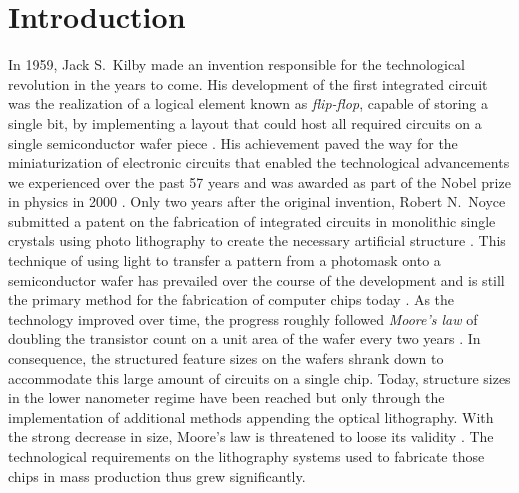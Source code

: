 \glsresetall
\chapter{Introduction} \label{ch:Intro}
In 1959, Jack S.~Kilby made an invention responsible for the technological revolution in the years to come. His development of the first integrated circuit was the realization of a logical element known as \emph{flip-flop}, capable of storing a single bit, by implementing a layout that could host all required circuits on a single semiconductor wafer piece  \cite{kilby_invention_1976}. His achievement paved the way for the miniaturization of electronic circuits that enabled the technological advancements we experienced over the past 57 years and was awarded as part of the Nobel prize in physics in 2000 \cite{noauthor_press_nodate}. Only two years after the original invention, Robert N.~Noyce submitted a patent on the fabrication of integrated circuits in monolithic single crystals using photo lithography to create the necessary artificial structure \cite{noyce_semiconductor_1961}. This technique of using light to transfer a pattern from a photomask onto a semiconductor wafer has prevailed over the course of the development and is still the primary method for the fabrication of computer chips today \cite{mack_fundamental_2008}. As the technology improved over time, the progress roughly followed \emph{Moore's law} of doubling the transistor count on a unit area of the wafer every two years \cite{moore_cramming_1998}. In consequence, the structured feature sizes on the wafers shrank down to accommodate this large amount of circuits on a single chip. Today, structure sizes in the lower nanometer regime have been reached \cite{international_roadmap_committee_international_2015} but only through the implementation of additional methods appending the optical lithography. With the strong decrease in size, Moore's law is threatened to loose its validity \cite{mack_fifty_2011, schaller_moores_1997}. The technological requirements on the lithography systems used to fabricate those chips in mass production thus grew significantly.


